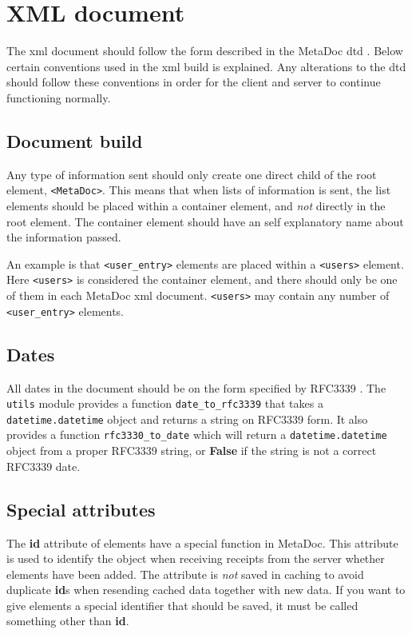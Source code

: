 \newpage
\section{XML document}
\label{sec:xmldoc}
The \gls{xml} document should follow the form described in the MetaDoc
\gls{dtd} \cite{metadoc_dtd}. Below certain conventions used in the \gls{xml}
build is explained. Any alterations to the \gls{dtd} should follow these
conventions in order for the client and server to continue functioning
normally. 

\subsection{Document build}
Any type of information sent should only create one direct child of the root
element, \texttt{<MetaDoc>}. This means that when lists of information is sent,
the list elements should be placed within a container element, and \textit{not}
directly in the root element. The container element should have an self
explanatory name about the information passed. 

An example is that \texttt{<user\_entry>} elements are placed within a
\texttt{<users>} element. Here \texttt{<users>} is considered the container
element, and there should only be one of them in each MetaDoc \gls{xml}
document.  \texttt{<users>} may contain any number of \texttt{<user\_entry>}
elements. 

\subsection{Dates}
All dates in the document should be on the form specified by RFC3339
\cite{rfc3339}. The \texttt{utils} module provides a function
\texttt{date\_to\_rfc3339} that takes a \texttt{datetime.datetime} object and
returns a string on RFC3339 form. It also provides a function
\texttt{rfc3330\_to\_date} which will return a \texttt{datetime.datetime}
object from a proper RFC3339 string, or \textbf{False} if the string is not a
correct RFC3339 date.

\subsection{Special attributes}
The \textbf{id} attribute of elements have a special function in MetaDoc. This
attribute is used to identify the object when receiving receipts from the
server whether elements have been added. The attribute is \textit{not} saved in
caching to avoid duplicate \textbf{id}s when resending cached data together
with new data. If you want to give elements a special identifier that should be
saved, it must be called something other than \textbf{id}.
